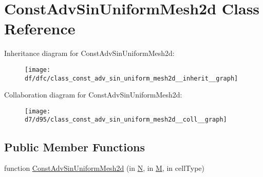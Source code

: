 \hypertarget{class_const_adv_sin_uniform_mesh2d}{}\section{Const\+Adv\+Sin\+Uniform\+Mesh2d Class Reference}
\label{class_const_adv_sin_uniform_mesh2d}


Inheritance diagram for Const\+Adv\+Sin\+Uniform\+Mesh2d\+:
\nopagebreak
\begin{figure}[H]
\begin{center}
\leavevmode
\texttt{[image: df/dfc/class\_const\_adv\_sin\_uniform\_mesh2d\_\_inherit\_\_graph]}
\end{center}
\end{figure}


Collaboration diagram for Const\+Adv\+Sin\+Uniform\+Mesh2d\+:
\nopagebreak
\begin{figure}[H]
\begin{center}
\leavevmode
\texttt{[image: d7/d95/class\_const\_adv\_sin\_uniform\_mesh2d\_\_coll\_\_graph]}
\end{center}
\end{figure}
\subsection*{Public Member Functions}
\begin{DoxyCompactItemize}
\item 
function \hyperlink{class_const_adv_sin_uniform_mesh2d_a170517902a2ce0eedbd125f6f0a1f749}{Const\+Adv\+Sin\+Uniform\+Mesh2d} (in \hyperlink{class_const_adv_sin_uniform_mesh2d_a75be19fb7212fe9031309e33dd562d5d}{N}, in \hyperlink{class_const_adv_sin_uniform_mesh2d_a5caaf348aeb9a7a3aa4e2741bca66516}{M}, in cell\+Type)
\end{DoxyCompactItemize}
